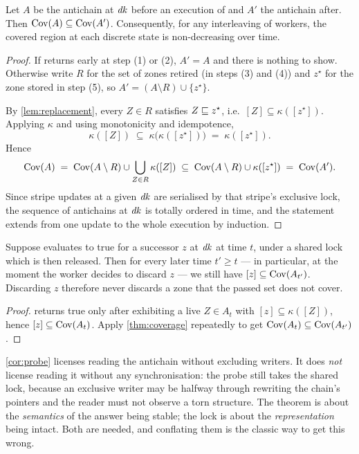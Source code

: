 \begin{theorem}\label{thm:coverage}
Let $A$ be the antichain at $\mathit{dk}$ before an execution of  and $A'$
the antichain after.  Then $\mathrm{Cov}(A) \subseteq \mathrm{Cov}(A')$.  Consequently, for any
interleaving of workers, the covered region at each discrete state is
non-decreasing over time.
\end{theorem}

\FigCoverage

\begin{proof}
If  returns early at step (1) or (2), $A' = A$ and there is nothing to
show.  Otherwise write $R$ for the set of zones retired (in steps (3) and (4))
and $z^\star$ for the zone stored in step (5), so $A' = (A \setminus R) \cup
\{z^\star\}$.

By \cref{lem:replacement}, every $Z \in R$ satisfies $Z \sqsubseteq z^\star$, i.e.\
$[Z] \subseteq \kappa([z^\star])$.  Applying $\kappa$ and using monotonicity and
idempotence,
\[
  \kappa([Z]) \;\subseteq\; \kappa\big(\kappa([z^\star])\big) \;=\;
  \kappa([z^\star]).
\]
Hence
\[
  \mathrm{Cov}(A) \;=\; \mathrm{Cov}(A\setminus R) \cup \bigcup_{Z \in R}\kappa([Z])
          \;\subseteq\; \mathrm{Cov}(A\setminus R) \cup \kappa([z^\star])
          \;=\; \mathrm{Cov}(A').
\]
Since stripe updates at a given $\mathit{dk}$ are serialised by that stripe's exclusive
lock, the sequence of antichains at $\mathit{dk}$ is totally ordered in time, and the
statement extends from one update to the whole execution by induction.
\end{proof}

\begin{corollary}\label{cor:probe}
Suppose \code{probe\_kill} evaluates to true for a successor $z$ at $\mathit{dk}$ at
time $t$, under a shared lock which is then released.  Then for every later time
$t' \ge t$ --- in particular, at the moment the worker decides to discard $z$
--- we still have $[z] \subseteq \mathrm{Cov}(A_{t'})$.  Discarding $z$ therefore never
discards a zone that the passed set does not cover.
\end{corollary}

\begin{proof}
 returns true only after exhibiting a live $Z \in A_t$ with
$[z] \subseteq \kappa([Z])$, hence $[z] \subseteq \mathrm{Cov}(A_t)$.  Apply
\cref{thm:coverage} repeatedly to get $\mathrm{Cov}(A_t) \subseteq \mathrm{Cov}(A_{t'})$.
\end{proof}

\begin{remark}
\cref{cor:probe} licenses reading the antichain without excluding writers.  It
does \emph{not} license reading it without any synchronisation: the probe still
takes the shared lock, because an exclusive writer may be halfway through
rewriting the chain's pointers and the reader must not observe a torn
structure.  The theorem is about the \emph{semantics} of the answer being
stable; the lock is about the \emph{representation} being intact.  Both are
needed, and conflating them is the classic way to get this wrong.
\end{remark}

